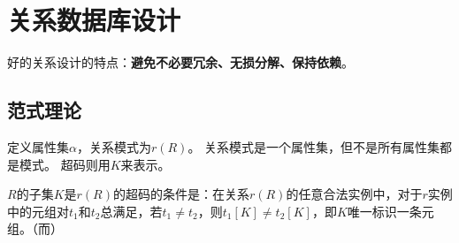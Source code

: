 
\section{关系数据库设计} %
好的关系设计的特点：\textbf{避免不必要冗余、无损分解、保持依赖}。

\subsection{范式理论}
定义属性集$\alpha$，关系模式为$r(R)$。
关系模式是一个属性集，但不是所有属性集都是模式。
超码则用$K$来表示。
\begin{definition}[超码]
$R$的子集$K$是$r(R)$的超码的条件是：在关系$r(R)$的任意合法实例中，对于$r$实例中的元组对$t_1$和$t_2$总满足，若$t_1\ne t_2$，则$t_1[K]\ne t_2[K]$，即$K$唯一标识一条元组。（而）
\end{definition}

